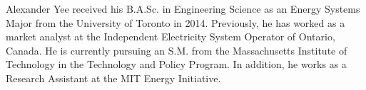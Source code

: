 \documentclass[journal]{IEEEtran}
\begin{document}
% 



\begin{IEEEbiographynophoto}{Alexander Yee}
received his B.A.Sc. in Engineering Science as an Energy Systems Major from the University of Toronto in 2014. Previously, he has worked as a market analyst at the Independent Electricity System Operator of Ontario, Canada. He is currently pursuing an S.M. from the Massachusetts Institute of Technology in the Technology and Policy Program. In addition, he works as a Research Assistant at the MIT Energy Initiative.
\end{IEEEbiographynophoto}









\end{document}
